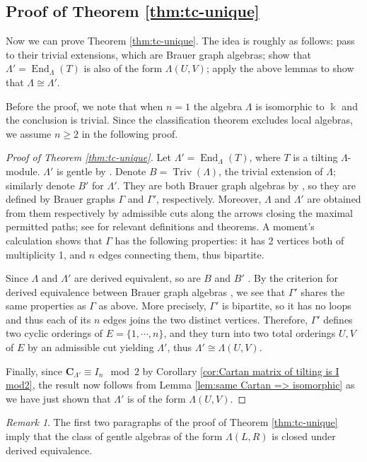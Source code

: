 \documentclass[11pt,reqno]{amsart}
\theoremstyle{plain}
\theoremstyle{definition}
\theoremstyle{remark}
\newtheorem{remark}[theorem]{Remark}
\numberwithin{equation}{section}
\begin{document}
\subsection{Proof of Theorem \ref{thm:tc-unique}}
\par Now we can prove Theorem \ref{thm:tc-unique}. The idea is roughly as follows: pass to their trivial extensions, which are Brauer graph algebras; show that $\Lambda'=\mathop{\mathrm{End}}_\Lambda(T)$ is also of the form $\Lambda(U,V)$; apply the above lemmas to show that $\Lambda\cong\Lambda'$.
\par Before the proof, we note that when $n=1$ the algebra $\Lambda$ is isomorphic to $\Bbbk$ and the conclusion is trivial. Since the classification theorem \cite[Theorem 7.12]{OZ} excludes local algebras, we assume $n\geq2$ in the following proof.
\begin{proof}[Proof of Theorem \ref{thm:tc-unique}]
    Let $\Lambda'=\mathop{\mathrm{End}}_\Lambda(T)$, where $T$ is a tilting $\Lambda$-module. $\Lambda'$ is gentle by \cite[Theorem 8.1]{APS}. Denote $B=\mathop{\mathrm{Triv}}(\Lambda)$, the trivial extension of $\Lambda$; similarly denote $B'$ for $\Lambda'$. They are both Brauer graph algebras by \cite[Theorem 1.2]{Sch}, so they are defined by Brauer graphs $\Gamma$ and $\Gamma'$, respectively. Moreover, $\Lambda$ and $\Lambda'$ are obtained from them respectively by admissible cuts along the arrows closing the maximal permitted paths; see \cite[Section 4]{Sch} for relevant definitions and theorems. A moment's calculation shows that $\Gamma$ has the following properties: it has 2 vertices both of multiplicity 1, and $n$ edges connecting them, thus bipartite.
    \par Since $\Lambda$ and $\Lambda'$ are derived equivalent, so are $B$ and $B'$ \cite[Theorem 3.1]{Ric}. By the criterion for derived equivalence between Brauer graph algebras \cite[Theorem 7.12]{OZ}, we see that $\Gamma'$ shares the same properties as $\Gamma$ as above. More precisely, $\Gamma'$ is bipartite, so it has no loops and thus each of its $n$ edges joins the two distinct vertices. Therefore, $\Gamma'$ defines two cyclic orderings of $E=\{1,\cdots,n\}$, and they turn into two total orderings $U,V$ of $E$ by an admissible cut yielding $\Lambda'$, thus $\Lambda'\cong\Lambda(U,V)$.
    \par Finally, since $\mathbf{C}_{\Lambda'}\equiv I_n\mod2$ by Corollary \ref{cor:Cartan matrix of tilting is I mod2}, the result now follows from Lemma \ref{lem:same Cartan => isomorphic} as we have just shown that $\Lambda'$ is of the form $\Lambda(U,V)$.
\end{proof}
\begin{remark}\label{rmk}
    The first two paragraphs of the proof of Theorem \ref{thm:tc-unique} imply that the class of gentle algebras of the form $\Lambda(L,R)$ is closed under derived equivalence.
\end{remark}
\end{document}
